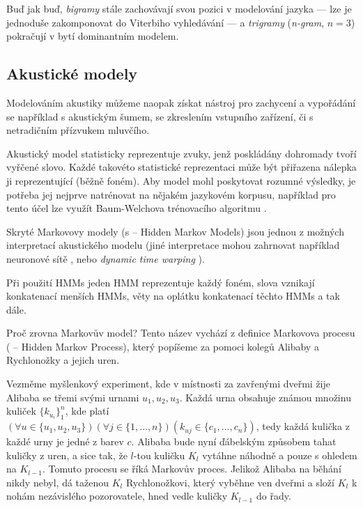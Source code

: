Buď jak buď, {\sl bigramy} stále zachovávají svou pozici v modelování jazyka --- lze je jednoduše zakomponovat do Viterbiho vyhledávání \cite{goblirsch_1996} --- a {\sl trigramy} ({\sl n-gram}, $n=3$) pokračují v bytí dominantním modelem.

\subsection{Akustické modely}

Modelováním akustiky můžeme naopak získat nástroj pro zachycení a vypořádání se například s akustickým šumem, se zkreslením vstupního zařízení, či s netradičním přízvukem mluvčího.

Akustický model statisticky reprezentuje zvuky, jenž poskládány dohromady tvoří vyřčené slovo. Každé takovéto statistické reprezentaci může být přiřazena nálepka ji reprezentující (běžně foném). Aby model mohl poskytovat rozumné výsledky, je potřeba jej nejprve natrénovat na nějakém jazykovém korpusu, například pro tento účel lze využít Baum-Welchova trénovacího algoritmu \cite{han_2003}.

Skryté Markovovy modely (s -- Hidden Markov Models) \cite{poritz_1988} jsou jednou z možných interpretací akustického modelu (jiné interpretace mohou zahrnovat například neuronové sítě \cite{kingsbury_2009}, nebo {\sl dynamic time warping} \cite{tarar_2010}).

Při použití HMMs jeden HMM reprezentuje každý foném, slova vznikají konkatenací menších HMMs, věty na oplátku konkatenací těchto HMMs a tak dále.

Proč zrovna  Markovův model? Tento název vychází z definice  Markovova procesu ( -- Hidden Markov Process), který popíšeme za pomoci kolegů Alibaby a Rychlonožky a jejich uren. 

Vezměme myšlenkový experiment, kde v místnosti za zavřenými dveřmi žije Alibaba se třemi svými urnami $u_1, u_2, u_3$. Každá urna obsahuje známou množinu kuliček $\{k_{u_i}\}_1^n$, kde platí $(\forall u \in \{u_1, u_2, u_3\})(\forall j \in \{1,\dots,n\})(k_{uj} \in \{c_1,\dots,c_n\})$, tedy každá kulička z každé urny je jedné z barev $c$. Alibaba bude nyní ďábelským způsobem tahat kuličky z uren, a sice tak, že $l$-tou kuličku $K_l$  vytáhne náhodně a pouze s ohledem na $K_{l-1}$. Tomuto procesu se říká Markovův proces. Jelikož Alibaba na běhání nikdy nebyl, dá taženou $K_l$ Rychlonožkovi, který vyběhne ven dveřmi a složí $K_l$ k nohám nezávislého pozorovatele, hned vedle kuličky $K_{l-1}$ do řady.

